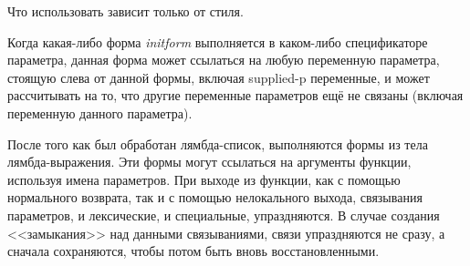 Что использовать зависит только от стиля.

Когда какая-либо форма \emph{initform} выполняется в каком-либо спецификаторе
параметра, данная форма может ссылаться на любую переменную параметра, стоящую
слева от данной формы, включая supplied-p переменные, и может рассчитывать на
то, что другие переменные параметров ещё не связаны (включая переменную данного
параметра).

После того как был обработан лямбда-список, выполняются формы из тела
лямбда-выражения. Эти формы могут ссылаться на аргументы функции, используя
имена параметров. При выходе из функции, как с помощью нормального возврата, так
и с помощью нелокального выхода, связывания параметров, и лексические, и
специальные, упраздняются. В случае создания <<замыкания>> над данными
связываниями, связи упраздняются не сразу, а сначала сохраняются, чтобы потом
быть вновь восстановленными. 


